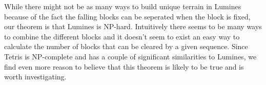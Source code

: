 While there might not be as many ways to build unique terrain in Lumines because of the fact the falling blocks can be seperated when the block is fixed, our theorem is that Lumines is NP-hard. Intuitively there seems to be many ways to combine the different blocks and it doesn't seem to exist an easy way to calculate the number of blocks that can be cleared by a given sequence. Since Tetris is NP-complete and has a couple of significant similarities to Lumines, we find even more reason to believe that this theorem is likely to be true and is worth investigating.
